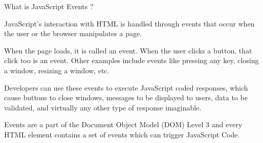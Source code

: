 What is JavaScript Events ?


JavaScript's interaction with HTML is handled through events that occur when the user or 
the browser manipulates a page.

When the page loads, it is called an event. When the user clicks a button, 
that click too is an event. Other examples include events like pressing any key, 
closing a window, resizing a window, etc.

Developers can use these events to execute JavaScript coded responses, 
which cause buttons to close windows, messages to be displayed to users, data to be validated, 
and virtually any other type of response imaginable.

Events are a part of the Document Object Model (DOM) Level 3 and every HTML element
contains a set of events which can trigger JavaScript Code.